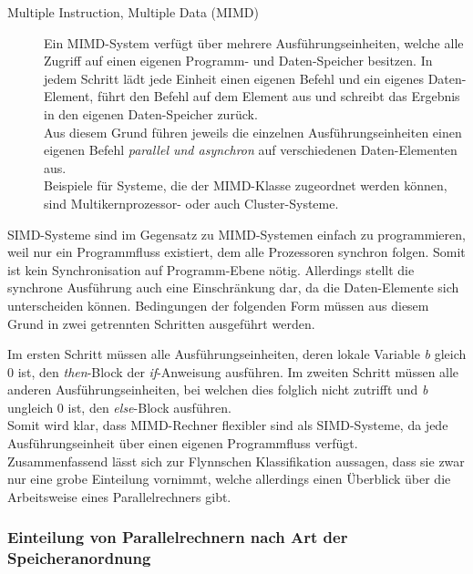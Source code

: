 \begin{description}
					\item [Multiple Instruction, Multiple Data (MIMD)]
						Ein MIMD-System verfügt über mehrere Ausführungseinheiten, welche alle Zugriff auf einen eigenen Programm- und Daten-Speicher besitzen. In jedem Schritt lädt jede Einheit einen eigenen Befehl und ein eigenes Daten-Element, führt den Befehl auf dem Element aus und schreibt das Ergebnis in den eigenen Daten-Speicher zurück.\\
						Aus diesem Grund führen jeweils die einzelnen Ausführungseinheiten einen eigenen Befehl \textit{parallel und asynchron} auf verschiedenen Daten-Elementen aus.\\
						Beispiele für Systeme, die der MIMD-Klasse zugeordnet werden können, sind Multikernprozessor- oder auch Cluster-Systeme. \cite{ParaProgRauber} \cite{FlynnscheKlassifikationWikipedia} \cite{EntwicklungParallelerProgramme}
				\end{description}
			
				SIMD-Systeme sind im Gegensatz zu MIMD-Systemen einfach zu programmieren, weil nur ein Programmfluss existiert, dem alle Prozessoren synchron folgen. Somit ist kein Synchronisation auf Programm-Ebene nötig. Allerdings stellt die synchrone Ausführung auch eine Einschränkung dar, da die Daten-Elemente sich unterscheiden können. Bedingungen der folgenden Form müssen aus diesem Grund in zwei getrennten Schritten ausgeführt werden.
				
				
				
				Im ersten Schritt müssen alle Ausführungseinheiten, deren lokale Variable \textit{b} gleich 0 ist, den \textit{then}-Block der \textit{if}-Anweisung ausführen. Im zweiten Schritt müssen alle anderen Ausführungseinheiten, bei welchen dies folglich nicht zutrifft und \textit{b} ungleich 0 ist, den \textit{else}-Block ausführen.\\
				Somit wird klar, dass MIMD-Rechner flexibler sind als SIMD-Systeme, da jede Ausführungseinheit über einen eigenen Programmfluss verfügt.\\
				Zusammenfassend lässt sich zur Flynnschen Klassifikation aussagen, dass sie zwar nur eine grobe Einteilung vornimmt, welche allerdings einen Überblick über die Arbeitsweise eines Parallelrechners gibt. \cite{ParaProgRauber}
		
			\subsubsection{Einteilung von Parallelrechnern nach Art der Speicheranordnung}
			

